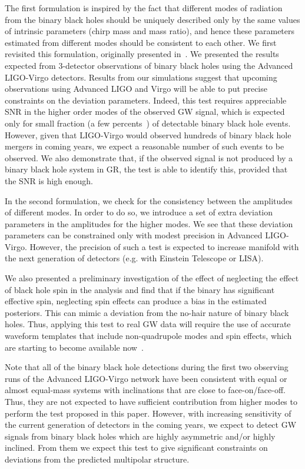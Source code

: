 \documentclass[prd,preprintnumbers,twocolumn,eqsecnum,floatfix,a4paper,nofootinbib,superscriptaddress]{revtex4}
\begin{document}
The first formulation is inspired by the fact that different modes of radiation from the binary black holes should be uniquely described only by the same values of intrinsic parameters (chirp mass and mass ratio), and hence these parameters estimated from different modes should be consistent to each other. We first revisited this formulation, originally presented in~\cite{Dhanpal:2018ufk}. We presented the results expected from 3-detector observations of binary black holes using the Advanced LIGO-Virgo detectors. Results from our simulations suggest that upcoming observations using Advanced LIGO and Virgo will be able to put precise constraints on the deviation parameters. Indeed, this test requires appreciable SNR in the higher order modes of the observed GW signal, which is expected only for small fraction (a few percents~\cite{Dhanpal}) of detectable binary black hole events. However, given that LIGO-Virgo would observed hundreds of binary black hole mergers in coming years, we expect a reasonable number of such events to be observed. We also demonstrate that, if the observed signal is not produced by a binary black hole system in GR, the test is able to identify this, provided that the SNR is high enough. 

In the second formulation, we check for the consistency between the amplitudes of different modes. In order to do so, we introduce a set of extra deviation parameters in the amplitudes for the higher modes. We see that these deviation parameters can be constrained only with modest precision in Advanced LIGO-Virgo. However, the precision of such a test is expected to increase manifold with the next generation of detectors (e.g. with Einstein Telescope or LISA). 

We also presented a preliminary investigation of the effect of neglecting the effect of black hole spin in the analysis and find that if the binary has significant effective spin, neglecting spin effects can produce a bias in the estimated posteriors. This can mimic a deviation from the no-hair nature of binary black holes. Thus, applying this test to real GW data will require the use of accurate waveform templates that include non-quadrupole modes and spin effects, which are starting to become available now~\cite{phenomhm,seobnrhm}. 

Note that all of the binary black hole detections during the first two observing runs of the Advanced LIGO-Virgo network have been consistent with equal or almost equal-mass systems with inclinations that are close to face-on/face-off. Thus, they are not expected to have sufficient contribution from higher modes to perform the test proposed in this paper. However, with increasing sensitivity of the current generation of detectors in the coming years, we expect to detect GW signals from binary black holes which are highly asymmetric and/or highly inclined. From them we expect this test to give significant constraints on deviations from the predicted multipolar structure. 
\end{document}
